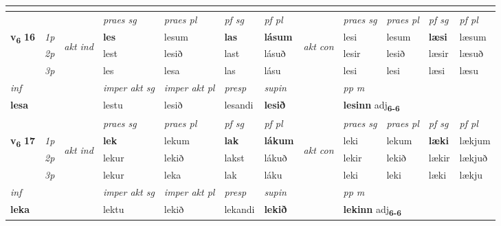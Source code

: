 \begin{longtable}[l]{X>{\footnotesize\itshape}llXXXXlXXXX}
\midrule
  & \\
   \midrule
 & &   & \textit{praes sg}  & \textit{praes pl}    & \textit{ pf sg} & \textit{pf pl} & & \textit{praes sg}  & \textit{praes pl}    & \textit{pf sg} & \textit{pf pl }  \\ \cmidrule{4-7} \cmidrule{9-12}
 \multirow{2}{*}{{{\textbf{v{\textsubscript{6}}} \Large{\textbf{16}}}}}  & 1p & \multirow{3}{*}{\begin{turn}{90}\textit{akt ind}\end{turn}} & \textbf{les} & lesum & \textbf{las} & \textbf{lásum} & \multirow{3}{*}{\begin{turn}{90}\textit{akt con}\end{turn}} &lesi & lesum & \textbf{læsi} & læsum\\*
 & 2p &  &  lest  & lesið & last & lásuð & & lesir & lesið & læsir & læsuð \\*
 & 3p &  & les & lesa & las & lásu & & lesi & lesi& læsi & læsu \\*
\cmidrule{4-7} \cmidrule{9-12}

   {\textit{inf}} & &  & \textit{imper akt sg} & \textit{imper akt pl}   & \textit{presp} & \textit{supin}  && \textit{pp m} \\*
  {\textbf{lesa}} & && lestu  & lesið   & lesandi &  \textbf{lesið}  && \multicolumn{2}{l}{\textbf{lesinn} adj\textbf{\textsubscript{6-6}}} \\*

\midrule

 & &   & \textit{praes sg}  & \textit{praes pl}    & \textit{ pf sg} & \textit{pf pl} & & \textit{praes sg}  & \textit{praes pl}    & \textit{pf sg} & \textit{pf pl }  \\ \cmidrule{4-7} \cmidrule{9-12}
 \multirow{2}{*}{{{\textbf{v{\textsubscript{6}}} \Large{\textbf{17}}}}}  & 1p & \multirow{3}{*}{\begin{turn}{90}\textit{akt ind}\end{turn}} & \textbf{lek} & lekum & \textbf{lak} & \textbf{lákum} & \multirow{3}{*}{\begin{turn}{90}\textit{akt con}\end{turn}} &leki & lekum & \textbf{læki} & lækjum\\*
 & 2p &  &  lekur  & lekið & lakst & lákuð & & lekir & lekið & lækir & lækjuð \\*
 & 3p &  & lekur & leka & lak & láku & & leki & leki& læki & lækju \\*
\cmidrule{4-7} \cmidrule{9-12}

   {\textit{inf}} & &  & \textit{imper akt sg} & \textit{imper akt pl}   & \textit{presp} & \textit{supin}  && \textit{pp m} \\*
  {\textbf{leka}} & && lektu  & lekið   & lekandi &  \textbf{lekið}  && \multicolumn{2}{l}{\textbf{lekinn} adj\textbf{\textsubscript{6-6}}} \\*


\end{longtable}
